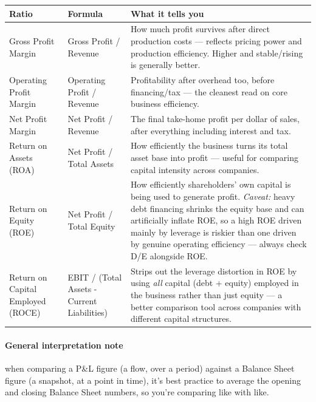 \documentclass[12pt,openany]{book}
\begin{document}
\begingroup
\small
\setlength{\tabcolsep}{4pt}
\begin{center}\begin{tabular}{|L{0.22\textwidth}|L{0.24\textwidth}|L{0.42\textwidth}|}
\hline
\textbf{Ratio} & \textbf{Formula} & \textbf{What it tells you} \\
\hline
Gross Profit Margin & Gross Profit / Revenue & How much profit survives after direct production costs --- reflects pricing power and production efficiency. Higher and stable/rising is generally better. \\
\hline
Operating Profit Margin & Operating Profit / Revenue & Profitability after overhead too, before financing/tax --- the cleanest read on core business efficiency. \\
\hline
Net Profit Margin & Net Profit / Revenue & The final take-home profit per dollar of sales, after everything including interest and tax. \\
\hline
Return on Assets (ROA) & Net Profit / Total Assets & How efficiently the business turns its total asset base into profit --- useful for comparing capital intensity across companies. \\
\hline
Return on Equity (ROE) & Net Profit / Total Equity & How efficiently shareholders' own capital is being used to generate profit. \emph{Caveat:} heavy debt financing shrinks the equity base and can artificially inflate ROE, so a high ROE driven mainly by leverage is riskier than one driven by genuine operating efficiency --- always check D/E alongside ROE. \\
\hline
Return on Capital Employed (ROCE) & EBIT / (Total Assets - Current Liabilities) & Strips out the leverage distortion in ROE by using \emph{all} capital (debt + equity) employed in the business rather than just equity --- a better comparison tool across companies with different capital structures. \\
\hline
\end{tabular}\end{center}
\endgroup

\paragraph{General interpretation note} when comparing a P\&L figure (a flow, over a period) against a Balance Sheet figure (a snapshot, at a point in time), it's best practice to average the opening and closing Balance Sheet numbers, so you're comparing like with like.
\end{document}
